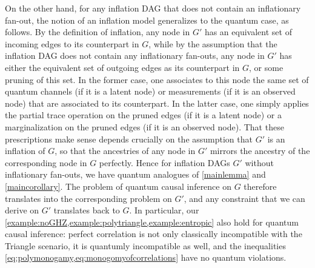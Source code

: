 \documentclass[aps,english,10pt,superscriptaddress,onecolumn,twoside,longbibliography,pra,floatfix,fleqn,nofootinbib]{revtex4-1}%
\theoremstyle{definition}
\newcounter{example}[section]
\begin{document}
On the other hand, for any inflation DAG that does not contain an inflationary fan-out, the notion of an inflation model generalizes to the quantum case, as follows.  By the definition of inflation, any node in $G'$ has an equivalent set of incoming edges to its counterpart in $G$, while by the assumption that the inflation DAG does not contain any inflationary fan-outs, any node in $G'$ has either the equivalent set of outgoing edges as its counterpart in $G$, or some pruning of this set.  In the former case, 
one associates to this node the same set of quantum channels (if it is a latent node) or measurements (if it is an observed node) that are associated to its counterpart. In the latter case, one simply applies the partial trace operation on the pruned edges (if it is a latent node) or a marginalization on the pruned edges (if it is an observed node).  
That these prescriptions make sense depends crucially on the assumption that $G'$ is an inflation of $G$, so that the ancestries of any node in $G'$ mirrors the ancestry of the corresponding node in $G$ perfectly. Hence for inflation DAGs $G'$ without inflationary fan-outs, we have quantum analogues of \cref{mainlemma} and \cref{maincorollary}. The problem of quantum causal inference on $G$ therefore translates into the corresponding problem on $G'$, and any constraint that we can derive on $G'$ translates back to $G$. In particular, our \cref{example:noGHZ,example:polytriangle,example:entropic} also hold for quantum causal inference: perfect correlation is not only classically incompatible with the Triangle scenario, it is quantumly incompatible as well, and the inequalities \cref{eq:polymonogamy,eq:monogomyofcorrelations} have no quantum violations. 
\end{document}
